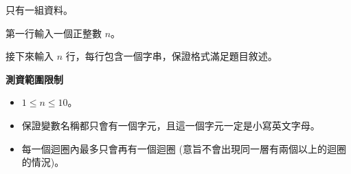 只有一組資料。

第一行輸入一個正整數 $n$。

接下來輸入 $n$ 行，每行包含一個字串，保證格式滿足題目敘述。

\textbf{測資範圍限制}

\begin{itemize}

\item $ 1 \le n \le 10$。

\item 保證變數名稱都只會有一個字元，且這一個字元一定是小寫英文字母。

\item 每一個迴圈內最多只會再有一個迴圈 (意旨不會出現同一層有兩個以上的迴圈的情況)。

\end{itemize}
